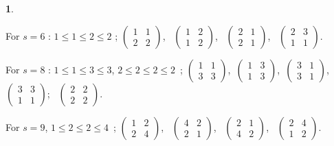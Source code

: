 \documentclass[a4paper,12pt]{article}
\theoremstyle{definition}
\theoremstyle{underlinethm}
\theoremstyle{definition}
\newtheorem{subsubsec}{}[subsection]
\begin{document}
\begin{subsubsec}
\begin{enumerate}[label=(\alph*)]
For $s=6$ : $1 \leq 1 \leq 2 \leq 2$  ; $\begin{pmatrix}1 & 1\\ 2 & 2\end{pmatrix}$,~ $\begin{pmatrix}1 & 2\\ 1 & 2\end{pmatrix}$,~ $\begin{pmatrix}2 & 1\\ 2 & 1\end{pmatrix}$,~ $\begin{pmatrix}2 & 3\\ 1 & 1\end{pmatrix}$.

{\fontsize{11}{14}\selectfont For $s=8$ : $1 \leq 1 \leq 3 \leq 3$, $2 \leq 2 \leq 2 \leq 2$~; $\begin{pmatrix}1 & 1\\ 3 & 3\end{pmatrix}$,~$\begin{pmatrix}1 & 3\\ 1 & 3\end{pmatrix}$,~$\begin{pmatrix}3 & 1\\ 3 & 1\end{pmatrix}$,~ $\begin{pmatrix}3 & 3\\ 1 & 1\end{pmatrix}$;~ $\begin{pmatrix}2 & 2\\ 2 & 2\end{pmatrix}$.} 
\end{enumerate}

For $s=9$, $1 \leq 2 \leq 2 \leq 4$~; $\begin{pmatrix}1 & 2\\ 2 & 4\end{pmatrix}$,~ $\begin{pmatrix}4 & 2\\ 2 & 1\end{pmatrix}$,~ $\begin{pmatrix}2 & 1\\ 4 & 2\end{pmatrix}$,~ $\begin{pmatrix}2 & 4\\ 1 & 2\end{pmatrix}$.

\end{subsubsec}
\end{document}
